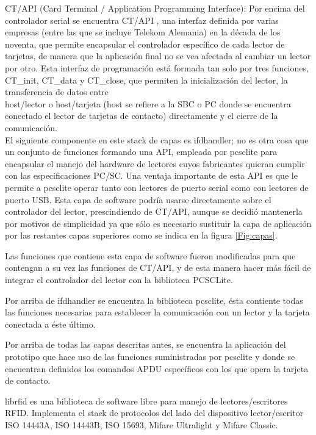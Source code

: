 \documentclass[%
        final,
        notitlepage,
        narroweqnarray,
        inline,
        ]{ieee}
\begin{document}
CT/API (Card Terminal / Application Programming Interface):
Por encima del controlador serial se encuentra CT/API \cite{ctapi}, una interfaz definida por varias empresas (entre las que se incluye Telekom Alemania) en la década de los noventa, que permite encapsular el controlador específico de cada lector de tarjetas, de manera que la aplicación final no se vea afectada al cambiar un lector por otro.
Esta interfaz de programación está formada tan solo por tres funciones, CT\_init, CT\_data y CT\_close, que permiten la inicialización del lector, la transferencia de datos entre \\
host/lector o host/tarjeta (host se refiere a la SBC o PC donde se encuentra conectado el lector de tarjetas de contacto) directamente y el cierre de la comunicación.\\


El siguiente componente en este stack de capas es ifdhandler; no es otra cosa que un conjunto de funciones formando una API, empleada por pcsclite para encapsular el manejo del hardware de lectores cuyos fabricantes quieran cumplir con las especificaciones PC/SC. Una ventaja importante de esta API es que le permite a pcsclite operar tanto con lectores de puerto serial como con lectores de puerto USB.
Esta capa de software podría usarse directamente sobre el controlador del lector, prescindiendo de CT/API, aunque se decidió mantenerla por motivos de simplicidad ya que sólo es necesario sustituir la capa de aplicación por las restantes capas superiores como se indica en la figura \ref{Fig:capas}.


Las funciones que contiene esta capa de software fueron modificadas para que contengan a su vez las funciones de CT/API, y de esta manera hacer más fácil de integrar el controlador del lector con la biblioteca PCSCLite.


Por arriba de ifdhandler se encuentra la biblioteca pcsclite, ésta contiente todas las funciones necesarias para establecer la comunicación con un lector y la tarjeta conectada a éste último.


Por arriba de todas las capas descritas antes, se encuentra la aplicación del prototipo que hace uso de las funciones suministradas por pcsclite y donde se encuentran definidos los comandos APDU específicos con los que opera la tarjeta de contacto.

\bigskip
{}
librfid es una biblioteca de software libre para manejo de lectores/escritores RFID. Implementa el stack de protocolos del lado del dispositivo lector/escritor ISO 14443A, ISO 14443B, ISO 15693, Mifare Ultralight y Mifare Classic.
\end{document}
